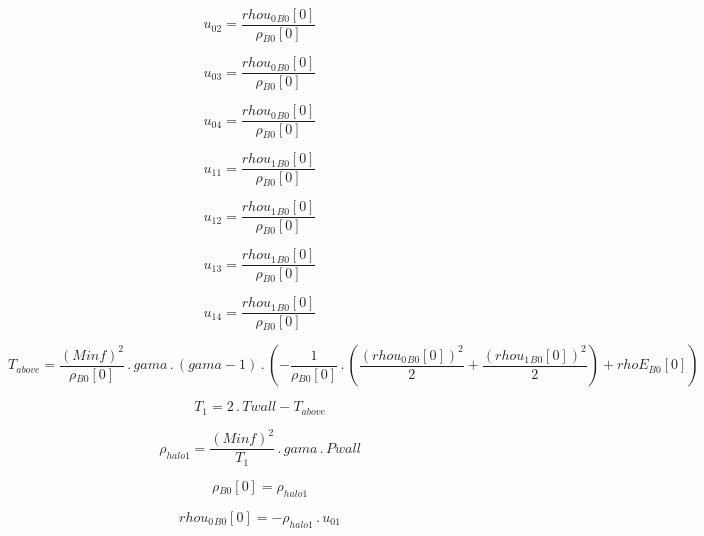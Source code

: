 \documentclass{article}
\begin{document}
\begin{dmath}u_{02} = \frac{{rhou_{0}{_{B0}}}[{0}]}{{\rho{_{B0}}}[{0}]}\end{dmath}

\begin{dmath}u_{03} = \frac{{rhou_{0}{_{B0}}}[{0}]}{{\rho{_{B0}}}[{0}]}\end{dmath}

\begin{dmath}u_{04} = \frac{{rhou_{0}{_{B0}}}[{0}]}{{\rho{_{B0}}}[{0}]}\end{dmath}

\begin{dmath}u_{11} = \frac{{rhou_{1}{_{B0}}}[{0}]}{{\rho{_{B0}}}[{0}]}\end{dmath}

\begin{dmath}u_{12} = \frac{{rhou_{1}{_{B0}}}[{0}]}{{\rho{_{B0}}}[{0}]}\end{dmath}

\begin{dmath}u_{13} = \frac{{rhou_{1}{_{B0}}}[{0}]}{{\rho{_{B0}}}[{0}]}\end{dmath}

\begin{dmath}u_{14} = \frac{{rhou_{1}{_{B0}}}[{0}]}{{\rho{_{B0}}}[{0}]}\end{dmath}

\begin{dmath}T_{above} = \frac{\left(Minf \right)^{2}}{{\rho{_{B0}}}[{0}]} \,.\, gama \,.\, \left(gama - 1\right) \,.\, \left(- \frac{1}{{\rho{_{B0}}}[{0}]} \,.\, \left(\frac{\left({rhou_{0}{_{B0}}}[{0}] \right)^{2}}{2} + 
\frac{\left({rhou_{1}{_{B0}}}[{0}] \right)^{2}}{2}\right) + {rhoE{_{B0}}}[{0}]\right)\end{dmath}

\begin{dmath}T_{1} = 2 \,.\, Twall - T_{above}\end{dmath}

\begin{dmath}\rho_{halo 1} = \frac{\left(Minf \right)^{2}}{T_{1}} \,.\, gama \,.\, Pwall\end{dmath}

\begin{dmath}{\rho{_{B0}}}[{0}] = \rho_{halo 1}\end{dmath}

\begin{dmath}{rhou_{0}{_{B0}}}[{0}] = - \rho_{halo 1} \,.\, u_{01}\end{dmath}
\end{document}
